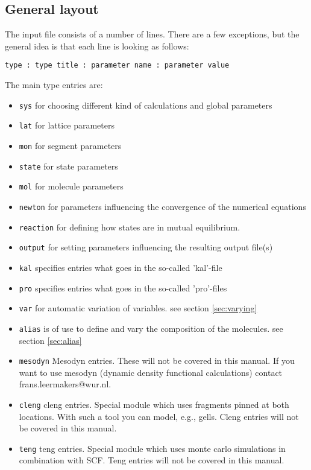 \documentclass{article}
\begin{document}
\subsection{General layout}
The input file consists of a number of lines. There are a few exceptions, but the general idea is that each line is looking as follows:
\begin{verbatim}
type : type title : parameter name : parameter value 
\end{verbatim}
The main type entries are:
\begin{itemize}
\item \texttt{sys} for choosing different kind of calculations and global parameters
\item \texttt{lat} for lattice parameters 
\item \texttt{mon} for segment parameters
\item \texttt{state} for state parameters
\item \texttt{mol} for molecule parameters 
\item \texttt{newton} for parameters influencing the convergence of the numerical equations
\item \texttt{reaction} for defining how states are in mutual equilibrium.
\item \texttt{output} for setting parameters influencing the resulting output file(s)
\item \texttt{kal} specifies entries what goes in the so-called 'kal'-file
\item \texttt{pro} specifies entries what goes in the so-called 'pro'-files
\item \texttt{var} for automatic variation of variables. see section \ref{sec:varying}
\item \texttt{alias} is of use to define and vary the composition of the molecules. see section \ref{sec:alias}
\item \texttt{mesodyn} Mesodyn entries. These will not be covered in this manual. If you want to use mesodyn (dynamic density functional calculations) contact frans.leermakers@wur.nl.
\item \texttt{cleng} cleng entries. Special module which uses fragments pinned at both locations. With such a tool you can model, e.g., gells. Cleng entries will not be covered in this manual.
\item \texttt{teng} teng entries. Special module which uses monte carlo simulations in combination with SCF. Teng entries will not be covered in this manual.
\end{itemize}
\end{document}
